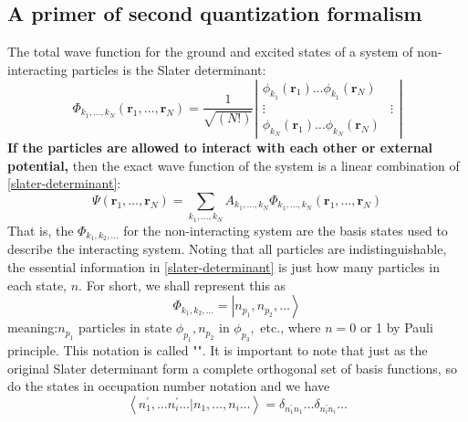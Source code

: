 \subsection{A primer of second quantization formalism}
The total wave function for the ground and excited states of a system of non-interacting particles is the Slater determinant:
\begin{equation}\Phi_{k_{1}, \ldots, k_{N}}\left(\mathbf{r}_{1}, \ldots, \mathbf{r}_{N}\right)=\frac{1}{\sqrt{(N !)}}\left|\begin{array}{cc}
\phi_{k_{1}}\left(\mathbf{r}_{1}\right) \ldots \phi_{k_{1}}\left(\mathbf{r}_{N}\right) \\
\vdots & \vdots \\
\phi_{k_{N}}\left(\mathbf{r}_{1}\right) \ldots \phi_{k_{N}}\left(\mathbf{r}_{N}\right)
\end{array}\right|
\label{slater-determinant}
\end{equation}
\textbf{If the particles are allowed to interact with each other or external potential,} then the exact wave function of the system is a linear combination of \ref{slater-determinant}:
\begin{equation}\Psi\left(\mathbf{r}_{1}, \ldots, \mathbf{r}_{N}\right)=\sum_{k_{1}, \ldots, k_{N}} A_{k_{1}, \ldots, k_{N}} \Phi_{k_{1}, \ldots, k_{N}}\left(\mathbf{r}_{1}, \ldots, \mathbf{r}_{N}\right)\end{equation}
That is, the $\Phi_{k_1,k_2,\ldots}$ for the non-interacting system are the basis states used to describe the interacting system. Noting that all particles are indistinguishable, the essential information in \ref{slater-determinant} is just how many particles in each state, $n$. For short, we shall represent this as
\begin{equation}
    \Phi_{k_1,k_2,\ldots}=\left|n_{p_1},n_{p_2},\ldots\right\rangle
\label{linear-comb-occ-vec}
\end{equation}
meaning:$n_{p_{1}}$ particles in state $\phi_{p_{1}}, n_{p_{2}}$ in $\phi_{p_{3}},$ etc., where $n=0$ or 1 by Pauli principle. This notation is called "". It is important to note that just as the original Slater determinant form a complete orthogonal set of basis functions, so do the states in occupation number notation and we have
\begin{equation}\left\langle n_{1}^{\prime}, \ldots n_{i}^{\prime} \ldots | n_{1}, \ldots, n_{i} \ldots\right\rangle=\delta_{n_1^{\prime}n_1}\ldots\delta_{n_i^{\prime}n_i}\ldots
\end{equation}
